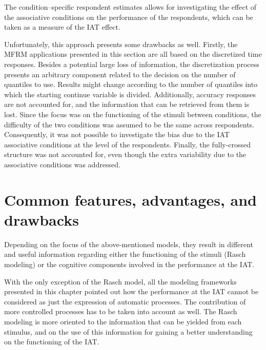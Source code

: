 \documentclass[12pt]{book}
\begin{document}
The condition--specific respondent estimates allows for investigating the effect of the associative conditions on the performance of the respondents, which can be taken as a measure of the IAT effect. 

Unfortunately, this approach presents some drawbacks as well. 
Firstly, the MFRM applications presented in this section are all based on the discretized time responses. Besides a potential large loss of information, the discretization process presents an arbitrary component related to the decision on the number of quantiles to use.
Results might change according to the number of quantiles into which the starting continue variable is divided.
Additionally, accuracy responses are not accounted for, and the information that can be retrieved from them is lost.
Since the focus was on the functioning of the stimuli between conditions, the difficulty of the two conditions was assumed to be the same across respondents. Consequently, it was not possible to investigate the bias due to the IAT associative conditions at the level of the respondents.
Finally, the fully-crossed structure was not accounted for, even though the extra variability due to the associative conditions was addressed.

\section{Common features, advantages, and drawbacks} 

Depending on the focus of the above-mentioned models, they result in different and useful information regarding either the functioning of the stimuli (Rasch modeling) or the cognitive components involved in the performance at the IAT. 

With the only exception of the Rasch model, all the modeling frameworks presented in this chapter pointed out how the performance at the IAT cannot be considered as just the expression of automatic processes. The contribution of more controlled processes has to be taken into account as well. 
The Rasch modeling is more oriented to the information that can be yielded from each stimulus, and on the use of this information for gaining a better understanding on the functioning of the IAT.
\end{document}
